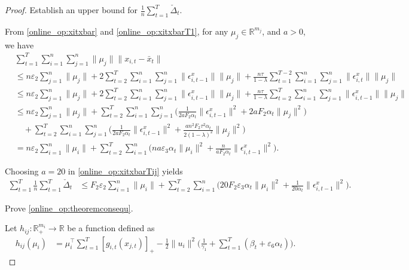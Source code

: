 \documentclass[12pt,draftcls,onecolumn]{IEEEtran}%
\begin{document}
\begin{proof}
 Establish an upper bound for $\frac{1}{n}\sum_{t=1}^{T}\check{\Delta}_t$.

From \eqref{online_op:xitxbar} and \eqref{online_op:xitxbarT1}, for any $\mu_j\in\mathbb{R}^{m_j}$, and $a>0$, we have
\begin{align}
&\sum_{t=1}^{T}\sum_{i=1}^n\sum_{j=1}^n\|\mu_j\|\|x_{i,t}-\bar{x}_{t}\|\nonumber\\
&\le n\varepsilon_2\sum_{j=1}^n\|\mu_j\|
+2\sum_{t=2}^{T}\sum_{i=1}^n\sum_{j=1}^n\|\epsilon^x_{i,t-1}\|\|\mu_j\|
+\frac{n\tau}{1-\lambda}\sum_{t=1}^{T-2}\sum_{i=1}^n
\sum_{j=1}^n\|\epsilon^x_{i,t}\|\|\mu_j\|\nonumber\\
&\le n\varepsilon_2\sum_{j=1}^n\|\mu_j\|
+2\sum_{t=2}^{T}\sum_{i=1}^n\sum_{j=1}^n\|\epsilon^x_{i,t-1}\|\|\mu_j\|
+\frac{n\tau}{1-\lambda}\sum_{t=2}^{T}\sum_{i=1}^n
\sum_{j=1}^n\|\epsilon^x_{i,t-1}\|\|\mu_j\|\nonumber\\
&\le n\varepsilon_2\sum_{j=1}^n\|\mu_j\|
+\sum_{t=2}^{T}\sum_{i=1}^n\sum_{j=1}^n\Big(\frac{1}{2aF_2\alpha_t}\|\epsilon^x_{i,t-1}\|^2
+2aF_2\alpha_t\|\mu_j\|^2\Big)\nonumber\\
&\quad
+\sum_{t=2}^{T}\sum_{i=1}^n\sum_{j=1}^n\Big(\frac{1}{2aF_2\alpha_t}\|\epsilon^x_{i,t-1}\|^2
+\frac{an^2F_2\tau^2\alpha_t}{2(1-\lambda)^2}\|\mu_j\|^2\Big)\nonumber\\
&= n\varepsilon_2\sum_{i=1}^n\|\mu_i\|
+\sum_{t=2}^{T}\sum_{i=1}^n\Big(na\varepsilon_3\alpha_t\|\mu_i\|^2
+\frac{n}{aF_2\alpha_t}\|\epsilon^x_{i,t-1}\|^2\Big).
\label{online_op:xitxbarTij}
\end{align}

Choosing $a=20$ in \eqref{online_op:xitxbarTij} yields
\begin{align}
\sum_{t=1}^{T}\frac{1}{n}\sum_{t=1}^{T}\check{\Delta}_t
&\le F_2\varepsilon_2\sum_{i=1}^n\|\mu_i\|
+\sum_{t=2}^{T}\sum_{i=1}^n\Big(20F_2\varepsilon_3\alpha_t\|\mu_i\|^2
+\frac{1}{20\alpha_t}\|\epsilon^x_{i,t-1}\|^2\Big).
\label{online_op:xitxbarTij_g}
\end{align}

 Prove \eqref{online_op:theoremconsequ}.

Let $h_{ij}:\mathbb{R}^{m_i}_{+}\rightarrow\mathbb{R}$ be a function defined as
\begin{align}\label{online_op:gc}
h_{ij}(\mu_i)&=\mu_i^\top\sum_{t=1}^T[g_{i,t}(x_{j,t})]_+ -\frac{1}{2}\|u_i\|^2\Big(\frac{1}{\gamma_1}
+\sum_{t=1}^T(\beta_{t}+\varepsilon_6\alpha_{t})\Big).
\end{align}


\end{proof}
\end{document}
